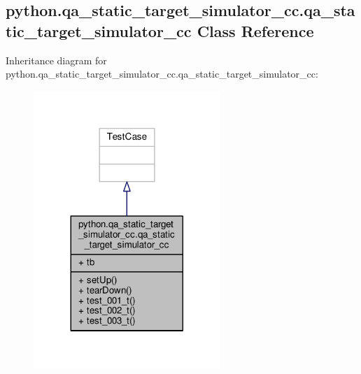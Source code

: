 \subsection{python.\+qa\+\_\+static\+\_\+target\+\_\+simulator\+\_\+cc.\+qa\+\_\+static\+\_\+target\+\_\+simulator\+\_\+cc Class Reference}
\label{classpython_1_1qa__static__target__simulator__cc_1_1qa__static__target__simulator__cc}


Inheritance diagram for python.\+qa\+\_\+static\+\_\+target\+\_\+simulator\+\_\+cc.\+qa\+\_\+static\+\_\+target\+\_\+simulator\+\_\+cc\+:
\nopagebreak
\begin{figure}[H]
\begin{center}
\leavevmode
\includegraphics[width=200pt]{d8/d50/classpython_1_1qa__static__target__simulator__cc_1_1qa__static__target__simulator__cc__inherit__graph}
\end{center}
\end{figure}


